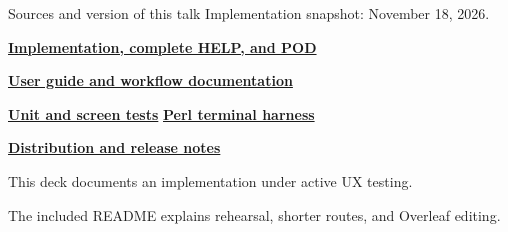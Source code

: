 \begin{frame}{Sources and version of this talk}
\small
Implementation snapshot:  \textemdash{} November 18, 2026.\par\medskip
\href{https://github.com/oodler577/p5-App-AnteREPL/blob/6ca970bb033241321097593ed832f62f2926c2e1/lib/App/AnteREPL.pm}{\textbf{Implementation, complete HELP, and POD}}\par\medskip
\href{https://github.com/oodler577/p5-App-AnteREPL/wiki}{\textbf{User guide and workflow documentation}}\par\medskip
\href{https://github.com/oodler577/p5-App-AnteREPL/tree/6ca970bb033241321097593ed832f62f2926c2e1/t}{\textbf{Unit and screen tests}}\hspace{5mm}
\href{https://github.com/oodler577/p5-App-AnteREPL/blob/6ca970bb033241321097593ed832f62f2926c2e1/tools/terminal-smoke.pl}{\textbf{Perl terminal harness}}\par\medskip
\href{https://github.com/oodler577/p5-App-AnteREPL/blob/6ca970bb033241321097593ed832f62f2926c2e1/CONTRIBUTING.md}{\textbf{Distribution and release notes}}
\par\vspace{4mm}
This deck documents an implementation under active UX testing.\par
The included README explains rehearsal, shorter routes, and Overleaf editing.
\end{frame}

